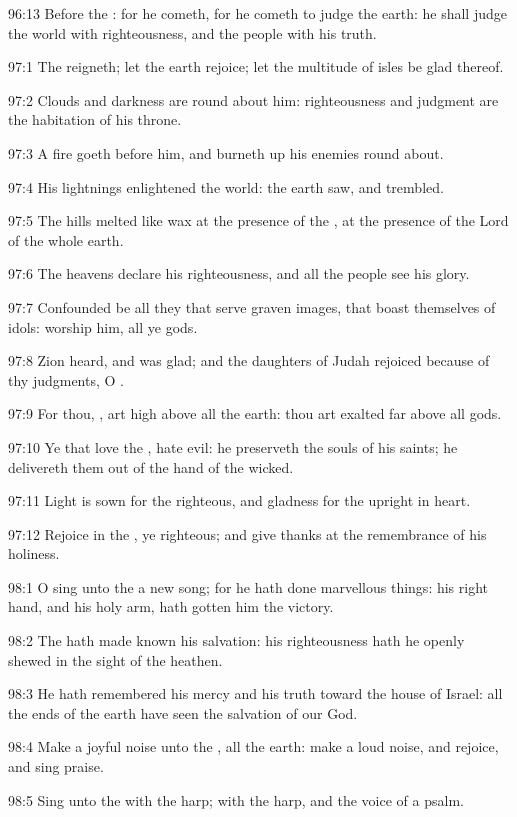 96:13 Before the \LORD: for he cometh, for he cometh to judge the
earth: he shall judge the world with righteousness, and the people
with his truth.



97:1 The \LORD reigneth; let the earth rejoice; let the multitude of
isles be glad thereof.

97:2 Clouds and darkness are round about him: righteousness and
judgment are the habitation of his throne.

97:3 A fire goeth before him, and burneth up his enemies round about.

97:4 His lightnings enlightened the world: the earth saw, and
trembled.

97:5 The hills melted like wax at the presence of the \LORD, at the
presence of the Lord of the whole earth.

97:6 The heavens declare his righteousness, and all the people see his
glory.

97:7 Confounded be all they that serve graven images, that boast
themselves of idols: worship him, all ye gods.

97:8 Zion heard, and was glad; and the daughters of Judah rejoiced
because of thy judgments, O \LORD.

97:9 For thou, \LORD, art high above all the earth: thou art exalted
far above all gods.

97:10 Ye that love the \LORD, hate evil: he preserveth the souls of his
saints; he delivereth them out of the hand of the wicked.

97:11 Light is sown for the righteous, and gladness for the upright in
heart.

97:12 Rejoice in the \LORD, ye righteous; and give thanks at the
remembrance of his holiness.



98:1 O sing unto the \LORD a new song; for he hath done marvellous
things: his right hand, and his holy arm, hath gotten him the victory.

98:2 The \LORD hath made known his salvation: his righteousness hath he
openly shewed in the sight of the heathen.

98:3 He hath remembered his mercy and his truth toward the house of
Israel: all the ends of the earth have seen the salvation of our God.

98:4 Make a joyful noise unto the \LORD, all the earth: make a loud
noise, and rejoice, and sing praise.

98:5 Sing unto the \LORD with the harp; with the harp, and the voice of
a psalm.

